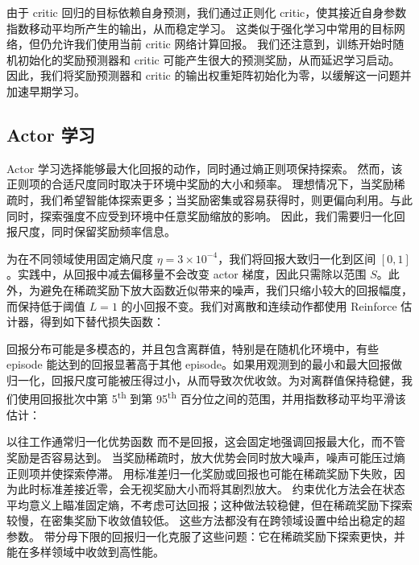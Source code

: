 由于 critic 回归的目标依赖自身预测，我们通过正则化 critic，使其接近自身参数指数移动平均所产生的输出，从而稳定学习。
这类似于强化学习中常用的目标网络\citep{mnih2015dqn}，但仍允许我们使用当前 critic 网络计算回报。
我们还注意到，训练开始时随机初始化的奖励预测器和 critic 可能产生很大的预测奖励，从而延迟学习启动。
因此，我们将奖励预测器和 critic 的输出权重矩阵初始化为零，以缓解这一问题并加速早期学习。

\subsection*{Actor 学习}

Actor 学习选择能够最大化回报的动作，同时通过熵正则项保持探索\citep{williams1991maxentreinforce}。
然而，该正则项的合适尺度同时取决于环境中奖励的大小和频率。
理想情况下，当奖励稀疏时，我们希望智能体探索更多；当奖励密集或容易获得时，则更偏向利用。与此同时，探索强度不应受到环境中任意奖励缩放的影响。
因此，我们需要归一化回报尺度，同时保留奖励频率信息。

为在不同领域使用固定熵尺度 $\eta=3\times10^{-4}$，我们将回报大致归一化到区间 $[0, 1]$。实践中，从回报中减去偏移量不会改变 actor 梯度，因此只需除以范围 $S$。此外，为避免在稀疏奖励下放大函数近似带来的噪声，我们只缩小较大的回报幅度，而保持低于阈值 $L=1$ 的小回报不变。我们对离散和连续动作都使用 Reinforce 估计器\citep{williams1992reinforce}，得到如下替代损失函数：


回报分布可能是多模态的，并且包含离群值，特别是在随机化环境中，有些 episode 能达到的回报显著高于其他 episode。如果用观测到的最小和最大回报做归一化，回报尺度可能被压得过小，从而导致次优收敛。为对离群值保持稳健，我们使用回报批次中第 5\textsuperscript{th} 到第 95\textsuperscript{th} 百分位之间的范围，并用指数移动平均平滑该估计：


以往工作通常归一化优势函数\citep{schulman2017ppo} 而不是回报，这会固定地强调回报最大化，而不管奖励是否容易达到。
当奖励稀疏时，放大优势会同时放大噪声，噪声可能压过熵正则项并使探索停滞。
用标准差归一化奖励或回报也可能在稀疏奖励下失败，因为此时标准差接近零，会无视奖励大小而将其剧烈放大。
约束优化方法会在状态平均意义上瞄准固定熵\citep{haarnoja2018sac,abdolmaleki2018mpo}，不考虑可达回报；这种做法较稳健，但在稀疏奖励下探索较慢，在密集奖励下收敛值较低。
这些方法都没有在跨领域设置中给出稳定的超参数。
带分母下限的回报归一化克服了这些问题：它在稀疏奖励下探索更快，并能在多样领域中收敛到高性能。

